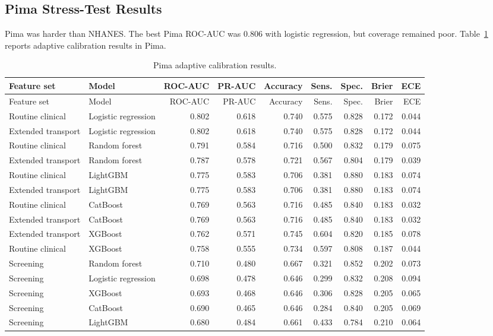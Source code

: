\documentclass[11pt]{article}
\begin{document}
\subsection{Pima Stress-Test Results}
Pima was harder than NHANES. The best Pima ROC-AUC was 0.806 with logistic regression, but coverage remained poor. Table~\ref{tab:pima_adaptive} reports adaptive calibration results in Pima.

\begin{landscape}
\begin{longtable}{llrrrrrrr}
\caption{Pima adaptive calibration results.}
\label{tab:pima_adaptive}\\
\toprule
Feature set & Model & ROC-AUC & PR-AUC & Accuracy & Sens. & Spec. & Brier & ECE \\
\midrule
\endfirsthead
\toprule
Feature set & Model & ROC-AUC & PR-AUC & Accuracy & Sens. & Spec. & Brier & ECE \\
\midrule
\endhead
Routine clinical & Logistic regression & 0.802 & 0.618 & 0.740 & 0.575 & 0.828 & 0.172 & 0.044 \\
Extended transport & Logistic regression & 0.802 & 0.618 & 0.740 & 0.575 & 0.828 & 0.172 & 0.044 \\
Routine clinical & Random forest & 0.791 & 0.584 & 0.716 & 0.500 & 0.832 & 0.179 & 0.075 \\
Extended transport & Random forest & 0.787 & 0.578 & 0.721 & 0.567 & 0.804 & 0.179 & 0.039 \\
Routine clinical & LightGBM & 0.775 & 0.583 & 0.706 & 0.381 & 0.880 & 0.183 & 0.074 \\
Extended transport & LightGBM & 0.775 & 0.583 & 0.706 & 0.381 & 0.880 & 0.183 & 0.074 \\
Routine clinical & CatBoost & 0.769 & 0.563 & 0.716 & 0.485 & 0.840 & 0.183 & 0.032 \\
Extended transport & CatBoost & 0.769 & 0.563 & 0.716 & 0.485 & 0.840 & 0.183 & 0.032 \\
Extended transport & XGBoost & 0.762 & 0.571 & 0.745 & 0.604 & 0.820 & 0.185 & 0.078 \\
Routine clinical & XGBoost & 0.758 & 0.555 & 0.734 & 0.597 & 0.808 & 0.187 & 0.044 \\
Screening & Random forest & 0.710 & 0.480 & 0.667 & 0.321 & 0.852 & 0.202 & 0.073 \\
Screening & Logistic regression & 0.698 & 0.478 & 0.646 & 0.299 & 0.832 & 0.208 & 0.094 \\
Screening & XGBoost & 0.693 & 0.468 & 0.646 & 0.306 & 0.828 & 0.205 & 0.065 \\
Screening & CatBoost & 0.690 & 0.465 & 0.646 & 0.284 & 0.840 & 0.205 & 0.069 \\
Screening & LightGBM & 0.680 & 0.484 & 0.661 & 0.433 & 0.784 & 0.210 & 0.064 \\
\bottomrule
\end{longtable}
\end{landscape}
\end{document}
